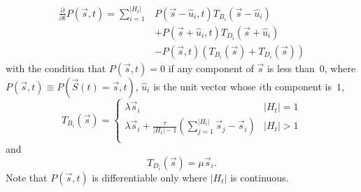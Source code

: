 \documentclass{article}
\begin{document}
            \begin{equation}
                \begin{split}
                    \frac{\partial}{\partial t} P\left(\vec{s},t\right) =
                    \sum_{i=1}^{\lvert{H_t}\rvert}
                    &P\left(\vec{s} - \hat{u}_i, t\right)T_{B_i}\left(\vec{s} -
                    \hat{u}_i\right) \\ &+ P\left(\vec{s} + \hat{u}_i,
                    t\right)T_{D_i}\left(\vec{s} + \hat{u}_i \right) \\ &-
                    P\left(\vec{s}, t\right)\left(T_{B_i}\left(\vec{s}\right) +
                    T_{D_i}\left(\vec{s} \right)\right)
                \end{split}
            \end{equation}
            with the condition that $P\left(\vec{s},t\right) = 0$ if any
            component of $\vec{s}$ is less than~$0$, where $P\left(\vec{s},
            t\right) \equiv P\left(\vec{S}\left(t\right)
            = \vec{s}, t\right)$, $\hat{u}_i$ is the unit vector whose $i$th
            component is~$1$,
            \begin{equation}
                T_{B_i}\left(\vec{s}\right) =
                \begin{cases}
                    \lambda \vec{s}_i & \lvert{H_t}\rvert = 1 \\
                    \lambda \vec{s}_i +
                    \frac{\tau}{\lvert{H_t}\rvert - 1}
                    \left(\sum_{j=1}^{\lvert{H_t}\rvert}
                    {\vec{s}_j}-\vec{s}_i\right) & \lvert{H_t}\rvert > 1 \\
                \end{cases}
            \end{equation}
            and
            \begin{equation}
                T_{D_i}\left(\vec{s}\right) = \mu \vec{s}_i.
            \end{equation}
            Note that $P\left(\vec{s},t\right)$ is differentiable only where
            $\lvert{H_t}\rvert$ is continuous.
\end{document}
